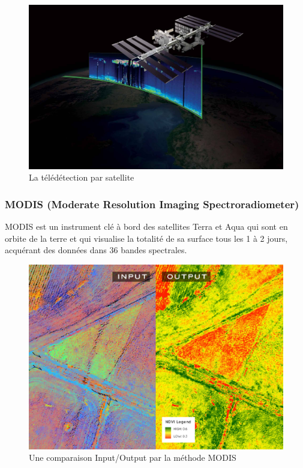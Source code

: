 \documentclass[12pt, openany]{report}
\begin{document}
\begin{figure}[hp]
\centering
\includegraphics[scale=0.2]{tele.jpg}
\caption{La télédétection par satellite}
\end{figure}

\newpage
\subsubsection{MODIS (Moderate Resolution Imaging Spectroradiometer)}
MODIS est un instrument clé à bord des satellites Terra et Aqua qui sont en orbite de la terre et qui visualise la totalité de sa surface tous les 1 à 2 jours, acquérant des données dans 36 bandes spectrales.\\

\begin{figure}[hp]
\centering
\includegraphics[scale=0.4]{modis.png}
\caption{Une comparaison Input/Output par la méthode MODIS}
\end{figure}
\end{document}
